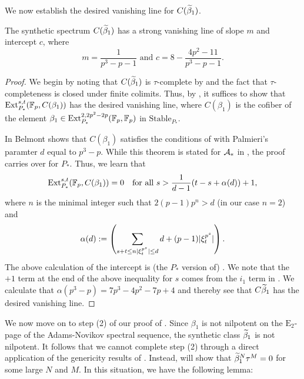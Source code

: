 We now establish the desired vanishing line for $C(\wt{\beta}_1)$.

\begin{lem} 
  \label{lemm:cbeta-vl}
    The synthetic spectrum $C(\wt{\beta}_1)$ has a strong vanishing line of slope $m$ and intercept $c$, where
  $$ m = \frac{1}{p^3 - p - 1} \text{  and  } c = 8 - \frac{4p^2 - 11}{p^3 - p -1}. $$
\end{lem}

\begin{proof}
    We begin by noting that $C(\wt{\beta}_1)$ is $\tau$-complete by  and the fact that $\tau$-completeness is closed under finite colimits.
  Thus, by , it suffices to show that 
    $ \operatorname{\mathrm{Ext}}_{P_*}^{s,t}(\operatorname{\mathbb{F}}_p, C(\beta_1)) $
    has the desired vanishing line, where $C(\beta_1)$ is the cofiber of the element $\beta_1 \in \operatorname{\mathrm{Ext}}_{P_*} ^{2,2p^2-2p} (\operatorname{\mathbb{F}}_p, \operatorname{\mathbb{F}}_p)$ in $\mathrm{Stable}_{P_*}$.

    In \cite[Section 3]{Eva} Belmont shows that $C(\beta_1)$ satisfies the conditions of \cite[Theorem 2.3.1]{PalmieriBook} with Palmieri's paramter $d$ equal to $p^3 - p$. While this theorem is stated for $\operatorname{\mathcal{A}}_*$ in \cite{PalmieriBook}, the proof carries over for $P_*$. Thus, we learn that
    $$ \operatorname{\mathrm{Ext}}_{P_*}^{s,t}(\operatorname{\mathbb{F}}_p, C(\beta_1)) = 0 \ \ \text{ for all } s > \frac{1}{d-1}(t-s + \alpha(d)) + 1, $$
  where $n$ is the minimal integer such that $2(p-1)p^n > d$ (in our case $n=2$) and
    $$ \alpha(d) := \left( \sum_{s+t \leq n \\ |\xi_t^{p^s}| \leq d} d + (p-1)|\xi_t^{p^s}| \right). $$
    The above calculation of the intercept is (the $P_*$ version of) \cite[Remark 2.3.4]{PalmieriBook}. We note that the $+1$ term at the end of the above inequality for $s$ comes from the $i_1$ term in \cite[Remark 2.3.4]{PalmieriBook}.
  We calculate that
  $\alpha(p^3 - p) = 7p^3 - 4p^2 - 7p + 4$ and thereby see that $C\wt{\beta}_1$ has the desired vanishing line.
\end{proof}


We now move on to step (2) of our proof of . Since $\beta_1$ is not nilpotent on the $\mathrm{E}_2$-page of the Adams-Novikov spectral sequence, the synthetic class $\wt{\beta}_1$ is not nilpotent. It follows that we cannot complete step (2) through a direct application of the genericity results of . Instead,  will show that $\wt{\beta}_1 ^N \tau^M = 0$ for some large $N$ and $M$. In this situation, we have the following lemma:

